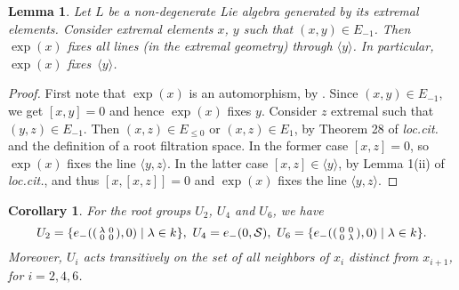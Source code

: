 \documentclass[oneside,a4paper]{amsart} %
\newtheorem{lemma}[theorem]{Lemma}
\newtheorem{corollary}[theorem]{Corollary}
\theoremstyle{definition}
\renewcommand{\SS}{\mathcal{S}}
\numberwithin{equation}{section}
\begin{document}
\begin{lemma}
\label{1-dim root groups}
	Let $L$ be a non-degenerate Lie algebra generated by its extremal elements.
	Consider extremal elements $x$, $y$ such that $(x,y)\in E_{-1}$.
	Then $\exp (x)$ fixes all lines (in the extremal geometry) through $\langle y\rangle $. 
	In particular, $\exp (x)$ fixes~$\langle y\rangle $.
\end{lemma}
\begin{proof}
	First note that $\exp(x)$ is an automorphism, by \cite[Lemma 15]{Cohen2006}.
	Since $(x,y)\in E_{-1}$, we get $[x,y]=0$ and hence $\exp(x)$ fixes $y$.
	Consider $z$ extremal such that $(y,z)\in E_{-1}$.
	Then $(x,z)\in E_{\leq 0}$ or $(x,z)\in E_1$, by Theorem 28 of \textit{loc.\@ cit.\@} and the definition of a root filtration space.
	In the former case $[x,z]=0$, so $\exp(x)$ fixes the line $\langle y,z\rangle$.
	In the latter case $[x,z]\in \langle y\rangle$, by Lemma 1(ii) of \textit{loc.\@ cit.\@}, and thus $[x,[x,z]]=0$ and $\exp (x)$ fixes the line $\langle y,z\rangle$.
\end{proof}
\begin{corollary}
\label{Hexagon U246}
	For the root groups $U_2$, $U_4$ and $U_6$, we have
	\[ U_2=\{e_-(\begin{psmallmatrix} \lambda&0\\0&0 \end{psmallmatrix},0)\mid \lambda \in k\}, \ U_4=e_-(0,\SS), \ U_6=\{e_-(\begin{psmallmatrix} 0&0\\0&\lambda \end{psmallmatrix},0)\mid \lambda \in k\}.\]
	Moreover, $U_i$ acts transitively on the set of all neighbors of $x_i$ distinct from $x_{i+1}$, for $i=2,4,6$.
\end{corollary}
\end{document}
